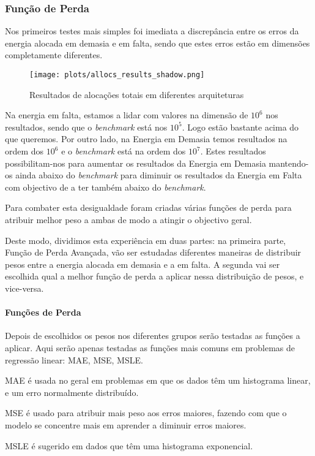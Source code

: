 \subsubsection{Função de Perda}

Nos primeiros testes mais simples foi imediata a discrepância entre os erros da energia alocada em demasia e em falta, sendo que estes erros estão em dimensões completamente diferentes.
\begin{figure}[H]
    \centering
    \texttt{[image: plots/allocs\_results\_shadow.png]}
    \caption{Resultados de alocações totais em diferentes arquiteturas}
    \label{fig:resexparchs}
  \end{figure}

Na energia em falta, estamos a lidar com valores na dimensão de $10^{6}$ nos resultados, sendo que o \textit{benchmark} está nos $10^{5}$. Logo estão bastante acima do que queremos. Por outro lado, na Energia em Demasia temos resultados na ordem dos $10^{6}$ e o \textit{benchmark} está na ordem dos $10^{7}$. Estes resultados possibilitam-nos para aumentar os resultados da Energia em Demasia mantendo-os ainda abaixo do \textit{benchmark} para diminuir os resultados da Energia em Falta com objectivo de a ter também abaixo do \textit{benchmark}.\par
Para combater esta desigualdade foram criadas várias funções de perda para atribuir melhor peso a ambas de modo a atingir o objectivo geral.\par
Deste modo, dividimos esta experiência em duas partes: na primeira parte, Função de Perda Avançada, vão ser estudadas diferentes maneiras de distribuir pesos entre a energia alocada em demasia e a em falta. A segunda vai ser escolhida qual a melhor função de perda a aplicar nessa distribuição de pesos, e vice-versa.\par


\paragraph{Funções de Perda}
\text{ }  \par
Depois de escolhidos os pesos nos diferentes grupos serão testadas as funções a aplicar. Aqui serão apenas testadas as funções mais comuns em problemas de regressão linear: \gls{MAE}, \gls{MSE}, \gls{MSLE}.\par
\gls{MAE} é usada no geral em problemas em que os dados têm um histograma linear, e um erro normalmente distribuído.\par
\gls{MSE} é usado para atribuir mais peso aos erros maiores, fazendo com que o modelo se concentre mais em aprender a diminuir erros maiores.\par
\gls{MSLE} é sugerido em dados que têm uma histograma exponencial.\par

